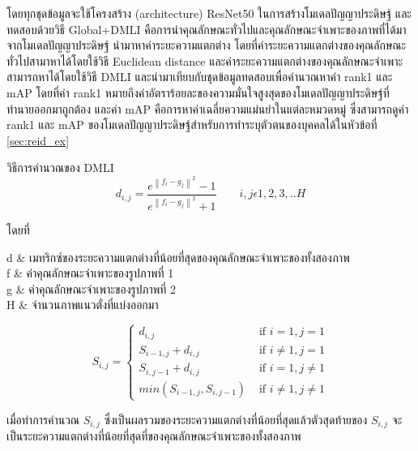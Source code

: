 โดยทุกชุดข้อมูลจะใช้โครงสร้าง (architecture) ResNet50 ในการสร้างโมเดลปัญญาประดิษฐ์ และทดสอบด้วยวิธี Global+DMLI คือการนำคุณลักษณะทั่วไปและคุณลักษณะจำเพาะของภาพที่ได้มาจากโมเดลปัญญาประดิษฐ์ นำมาหาค่าระยะความแตกต่าง โดยที่ค่าระยะความแตกต่างของคุณลักษณะทั่วไปสามาหาได้โดยใช้วิธี Euclidean distance และค่าระยะความแตกต่างของคุณลักษณะจำเพาะสามารถหาได้โดยใช้วิธี DMLI และนำมาเทียบกับชุดข้อมูลทดสอบเพื่อคำนวณหาค่า rank1 และ mAP โดยที่ค่า rank1 หมายถึงค่าอัตราร้อยละของความมั่นใจสูงสุดของโมเดลปัญญาประดิษฐ์ที่ทำนายออกมาถูกต้อง 
และค่า mAP คือการหาค่าเฉลี่ยความแม่นยำในแต่ละหมวดหมู่ ซึ่งสามารถดูค่า rank1 และ mAP ของโมเดลปัญญาประดิษฐ์สำหรับการทำระบุตัวตนของบุคคลได้ในหัวข้อที่ \ref{sec:reid_ex}

วิธีการคำนวณของ DMLI
\begin{equation}
d_{i,j} = \frac{e^{\left \| f_{i} - g_{j} \right \|^{2}} - 1}{e^{\left \| f_{i} - g_{j} \right \|^{2}} + 1} \qquad i,j \epsilon 1,2,3,..H
\end{equation}

โดยที่
\begin{conditions}
d		&		เมทริกซ์ของระยะความแตกต่างที่น้อยที่สุดของคุณลักษณะจำเพาะของทั้งสองภาพ			\\
f		&		ค่าคุณลักษณะจำเพาะของรูปภาพที่ 1				\\
g		&		ค่าคุณลักษณะจำเพาะของรูปภาพที่ 2				\\
H		&		จำนวนภาพแนวตั่งที่แบ่งออกมา
\end{conditions}

\begin{equation}
S_{i,j} = \begin{cases}
d_{i,j} & \text{ if } i=1,j=1 \\ 
S_{i-1,j}+d_{i,j} & \text{ if } i\neq 1,j=1 \\ 
S_{i,j-1}+d_{i,j} & \text{ if } i=1,j\neq1 \\ 
min(S_{i-1,j},S_{i,j-1}) & \text{ if } i\neq1,j\neq1 
\end{cases}
\end{equation}

เมื่อทำการคำนวณ $S_{i,j}$ ซึ่งเป็นผลรวมของระยะความแตกต่างที่น้อยที่สุดแล้วตัวสุดท้ายของ $S_{i,j}$ จะเป็นระยะความแตกต่างที่น้อยที่สุดที่ของคุณลักษณะจำเพาะของทั้งสองภาพ
